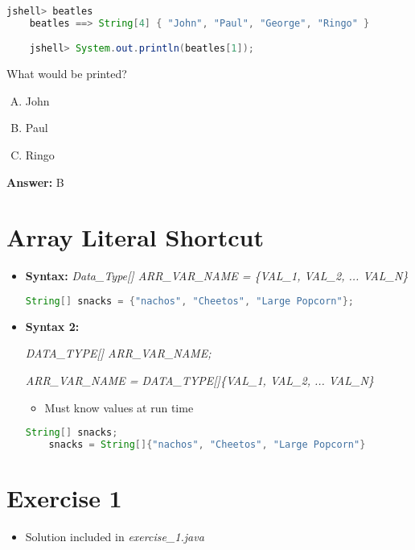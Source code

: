 \documentclass[12pt]{article}
\begin{document}
\begin{enumerate}[1.]
    \begin{lstlisting}[language=Java]
    jshell> beatles
    beatles ==> String[4] { "John", "Paul", "George", "Ringo" }

    jshell> System.out.println(beatles[1]);
    \end{lstlisting}

    What would be printed?

    \bigskip

    \begin{enumerate}[A.]
        \item John
        \item Paul
        \item Ringo
    \end{enumerate}

    \bigskip

    \textbf{Answer:} B

\end{enumerate}

\bigskip

\section{Array Literal Shortcut}

\bigskip

\begin{itemize}
    \item \textbf{Syntax:} \textit{Data\_Type[] ARR\_VAR\_NAME = \{VAL\_1, VAL\_2, ... VAL\_N\}}

    \begin{lstlisting}[language=Java]
    String[] snacks = {"nachos", "Cheetos", "Large Popcorn"};
    \end{lstlisting}

    \item \textbf{Syntax 2:}

    \textit{DATA\_TYPE[] ARR\_VAR\_NAME;}

    \textit{ARR\_VAR\_NAME  = DATA\_TYPE[]\{VAL\_1, VAL\_2, ... VAL\_N\}}

    \begin{itemize}
        \item Must know values at run time
    \end{itemize}


    \begin{lstlisting}[language=Java]
    String[] snacks;
    snacks = String[]{"nachos", "Cheetos", "Large Popcorn"}
    \end{lstlisting}
\end{itemize}

\bigskip

\section{Exercise 1}

\bigskip

\begin{itemize}
    \item Solution included in \textit{exercise\_1.java}
\end{itemize}
\end{document}
